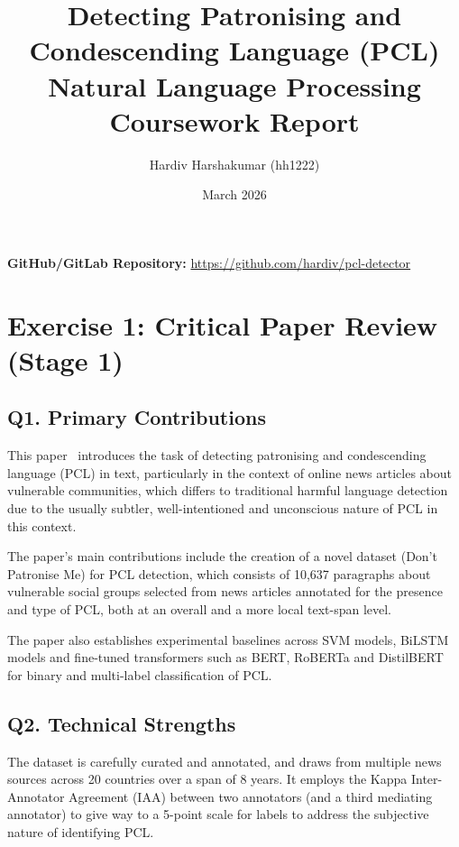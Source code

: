 \documentclass[11pt,a4paper]{article}
\title{Detecting Patronising and Condescending Language (PCL)\\
Natural Language Processing Coursework Report}
\author{Hardiv Harshakumar (hh1222)}
\date{March 2026}
\begin{document}
\maketitle


\noindent\textbf{GitHub/GitLab Repository:}
\url{https://github.com/hardiv/pcl-detector}

\newpage

\section{Exercise 1: Critical Paper Review (Stage 1)}\label{sec:paper_review}

\subsection{Q1. Primary Contributions}
This paper~\cite{perez-almendros-etal-2020-dont} introduces the task of
detecting patronising and condescending language (PCL) in text, particularly in
the context of online news articles about vulnerable communities, which differs
to traditional harmful language detection due to the usually subtler,
well-intentioned and unconscious nature of PCL in this context.

The paper's main contributions include the creation of a novel dataset (Don't
Patronise Me) for PCL detection, which consists of 10,637 paragraphs about
vulnerable social groups selected from news articles annotated for the presence
and type of PCL, both at an overall and a more local text-span level\@.

The paper also establishes experimental baselines across SVM models, BiLSTM
models and fine-tuned transformers such as BERT, RoBERTa and DistilBERT for
binary and multi-label classification of PCL\@.

\subsection{Q2. Technical Strengths}
The dataset is carefully curated and annotated, and draws from multiple news
sources across 20 countries over a span of 8 years. It employs the Kappa
Inter-Annotator Agreement (IAA) between two annotators (and a third mediating
annotator) to give way to a 5-point scale for labels to address the subjective
nature of identifying PCL\@.
\end{document}
